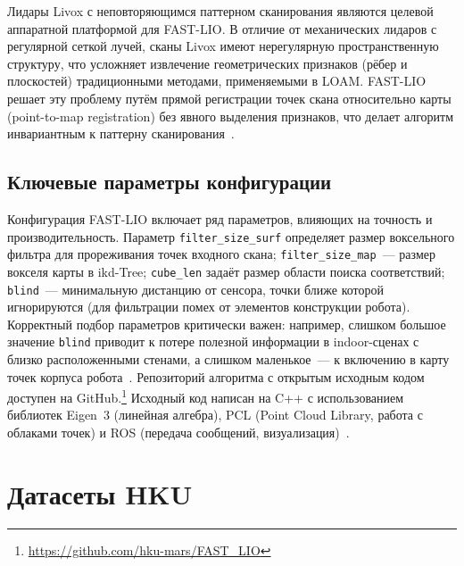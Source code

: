 \documentclass{misisarticle}
\begin{document}
Лидары Livox с неповторяющимся паттерном сканирования являются целевой аппаратной платформой для FAST-LIO. В отличие от механических лидаров с регулярной сеткой лучей, сканы Livox имеют нерегулярную пространственную структуру, что усложняет извлечение геометрических признаков (рёбер и плоскостей) традиционными методами, применяемыми в LOAM. FAST-LIO решает эту проблему путём прямой регистрации точек скана относительно карты (point-to-map registration) без явного выделения признаков, что делает алгоритм инвариантным к паттерну сканирования~\cite{xu2021,xu2022}.

\subsection{Ключевые параметры конфигурации}

Конфигурация FAST-LIO включает ряд параметров, влияющих на точность и производительность. Параметр \texttt{filter\_size\_surf} определяет размер воксельного фильтра для прореживания точек входного скана; \texttt{filter\_size\_map}~--- размер вокселя карты в ikd-Tree; \texttt{cube\_len} задаёт размер области поиска соответствий; \texttt{blind}~--- минимальную дистанцию от сенсора, точки ближе которой игнорируются (для фильтрации помех от элементов конструкции робота). Корректный подбор параметров критически важен: например, слишком большое значение \texttt{blind} приводит к потере полезной информации в indoor-сценах с близко расположенными стенами, а слишком маленькое~--- к включению в карту точек корпуса робота~\cite{xu2021}. Репозиторий алгоритма с открытым исходным кодом доступен на GitHub.\footnote{\url{https://github.com/hku-mars/FAST_LIO}} Исходный код написан на C++ с использованием библиотек Eigen~3 (линейная алгебра), PCL (Point Cloud Library, работа с облаками точек) и ROS (передача сообщений, визуализация)~\cite{xu2021}.

\section{Датасеты HKU}
\end{document}
